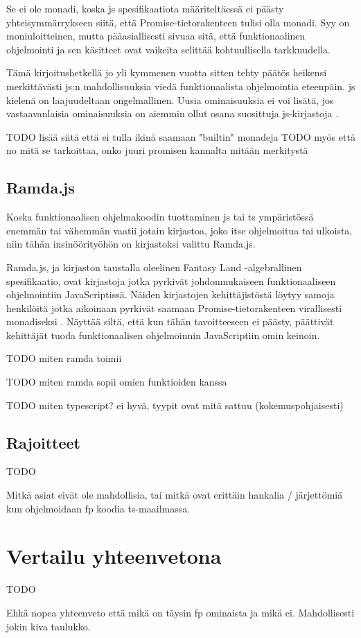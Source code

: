 Se ei ole monadi, koska \gls{js} spesifikaatiota määriteltäessä ei päästy yhteisymmärrykseen siitä, että Promise-tietorakenteen tulisi olla monadi. Syy on moniuloitteinen, mutta pääasiallisesti sivuaa sitä, että funktionaalinen ohjelmointi ja sen käsitteet ovat vaikeita selittää kohtuullisella tarkkuudella. \citep{promises-spec-94}

Tämä kirjoitushetkellä jo yli kymmenen vuotta sitten tehty päätös heikensi merkittävästi \gls{js}:n mahdollisuuksia viedä funktionaalista ohjelmointia eteenpäin. \Gls{js} kielenä on laajuudeltaan ongelmallinen. Uusia ominaisuuksia ei voi lisätä, jos vastaavanlaisia ominaisuuksia on aiemmin ollut osana suosittuja \gls{js}-kirjastoja \cite{proposal-joint-iteration,prototype_library_trends}.

TODO lisää siitä että ei tulla ikinä saamaan "builtin" monadeja
TODO myös että no mitä se tarkoittaa, onko juuri promisen kannalta mitään merkitystä

\subsection{Ramda.js}

Koska funktionaalisen ohjelmakoodin tuottaminen \gls{js} tai \gls{ts} ympäristössä enemmän tai vähemmän vaatii jotain kirjastoa, joko itse ohjelmoitua tai ulkoista, niin tähän insinöörityöhön on kirjastoksi valittu Ramda.js.

Ramda.js, ja kirjaston taustalla oleelinen Fantasy Land -algebrallinen spesifikaatio, ovat kirjastoja jotka pyrkivät johdonmukaiseen funktionaaliseen ohjelmointiin JavaScriptissä. Näiden kirjastojen kehittäjistöstä löytyy samoja henkilöitä jotka aikoinaan pyrkivät saamaan Promise-tietorakenteen virallisesti monadiseksi \cite{ramda:contributors,fantasy-land:contributors,promises-spec-94}. Näyttää siltä, että kun tähän tavoitteeseen ei päästy, päättivät kehittäjät tuoda funktionaalisen ohjelmoinnin JavaScriptiin omin keinoin.

TODO miten ramda toimii

TODO miten ramda sopii omien funktioiden kanssa

TODO miten typescript? ei hyvä, tyypit ovat mitä sattuu (kokemuspohjaisesti)

\subsection{Rajoitteet}

TODO

Mitkä asiat eivät ole mahdollisia, tai mitkä ovat erittäin hankalia / järjettömiä kun ohjelmoidaan \gls{fp} koodia \gls{ts}-maailmassa.


\section{Vertailu yhteenvetona}

TODO

Ehkä nopea yhteenveto että mikä on täysin \gls{fp} ominaista ja mikä ei. Mahdollisesti jokin kiva taulukko.